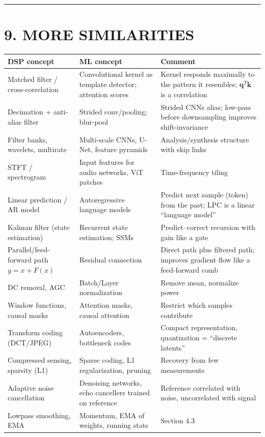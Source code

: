 \documentclass[11pt,a4paper]{article}
\begin{document}
\noindent\rule{\textwidth}{0.5pt}

\section{9. MORE SIMILARITIES}
\begin{table}[H]
\centering
\small
\begin{tabular}{p{4.2cm}p{4.4cm}p{6.0cm}}
\toprule
\textbf{DSP concept} & \textbf{ML concept} & \textbf{Comment} \\
\midrule
Matched filter / cross-correlation & Convolutional kernel as template detector; attention scores & Kernel responds maximally to the pattern it resembles; $\mathbf{q}^T\mathbf{k}$ is a correlation \\
Decimation + anti-alias filter & Strided conv/pooling; blur-pool & Strided CNNs alias; low-pass before downsampling improves shift-invariance \\
Filter banks, wavelets, multirate & Multi-scale CNNs, U-Net, feature pyramids & Analysis/synthesis structure with skip links \\
STFT / spectrogram & Input features for audio networks, ViT patches & Time-frequency tiling \\
Linear prediction / AR model & Autoregressive language models & Predict next sample (token) from the past; LPC is a linear ``language model'' \\
Kalman filter (state estimation) & Recurrent state estimation; SSMs & Predict--correct recursion with gain like a gate \\
Parallel/feed-forward path $y=x+F(x)$ & Residual connection & Direct path plus filtered path; improves gradient flow like a feed-forward comb \\
DC removal, AGC & Batch/Layer normalization & Remove mean, normalize power \\
Window functions, causal masks & Attention masks, causal attention & Restrict which samples contribute \\
Transform coding (DCT/JPEG) & Autoencoders, bottleneck codes & Compact representation, quantization = ``discrete latents'' \\
Compressed sensing, sparsity (L1) & Sparse coding, L1 regularization, pruning & Recovery from few measurements \\
Adaptive noise cancellation & Denoising networks, echo cancellers trained on reference & Reference correlated with noise, uncorrelated with signal \\
Lowpass smoothing, EMA & Momentum, EMA of weights, running stats & Section 4.3 \\
\bottomrule
\end{tabular}
\end{table}
\end{document}
